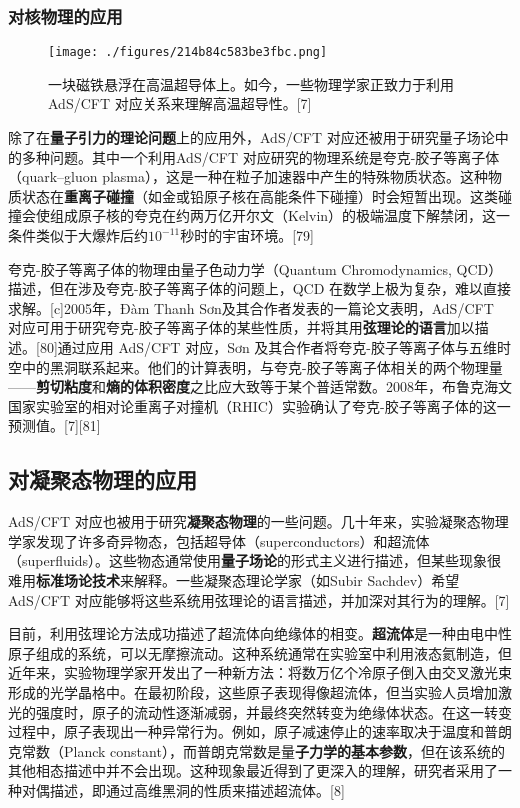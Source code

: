 \subsubsection{对核物理的应用}
\begin{figure}[ht]
\centering
\texttt{[image: ./figures/214b84c583be3fbc.png]}
\caption{一块磁铁悬浮在高温超导体上。如今，一些物理学家正致力于利用 AdS/CFT 对应关系来理解高温超导性。[7]} \label{fig_String_18}
\end{figure}
除了在\textbf{量子引力的理论问题}上的应用外，AdS/CFT 对应还被用于研究量子场论中的多种问题。其中一个利用AdS/CFT 对应研究的物理系统是夸克-胶子等离子体（quark–gluon plasma），这是一种在粒子加速器中产生的特殊物质状态。这种物质状态在\textbf{重离子碰撞}（如金或铅原子核在高能条件下碰撞）时会短暂出现。这类碰撞会使组成原子核的夸克在约两万亿开尔文（Kelvin）的极端温度下解禁闭，这一条件类似于大爆炸后约\(10^{-11}\)秒时的宇宙环境。[79]

夸克-胶子等离子体的物理由量子色动力学（Quantum Chromodynamics, QCD）描述，但在涉及夸克-胶子等离子体的问题上，QCD 在数学上极为复杂，难以直接求解。[c]2005年，Đàm Thanh Sơn及其合作者发表的一篇论文表明，AdS/CFT 对应可用于研究夸克-胶子等离子体的某些性质，并将其用\textbf{弦理论的语言}加以描述。[80]通过应用 AdS/CFT 对应，Sơn 及其合作者将夸克-胶子等离子体与五维时空中的黑洞联系起来。他们的计算表明，与夸克-胶子等离子体相关的两个物理量——\textbf{剪切粘度}和\textbf{熵的体积密度}之比应大致等于某个普适常数。2008年，布鲁克海文国家实验室的相对论重离子对撞机（RHIC）实验确认了夸克-胶子等离子体的这一预测值。[7][81]
\subsection{对凝聚态物理的应用} 
AdS/CFT 对应也被用于研究\textbf{凝聚态物理}的一些问题。几十年来，实验凝聚态物理学家发现了许多奇异物态，包括超导体（superconductors）和超流体（superfluids）。这些物态通常使用\textbf{量子场论}的形式主义进行描述，但某些现象很难用\textbf{标准场论技术}来解释。一些凝聚态理论学家（如Subir Sachdev）希望AdS/CFT 对应能够将这些系统用弦理论的语言描述，并加深对其行为的理解。[7]  

目前，利用弦理论方法成功描述了超流体向绝缘体的相变。\textbf{超流体}是一种由电中性原子组成的系统，可以无摩擦流动。这种系统通常在实验室中利用液态氦制造，但近年来，实验物理学家开发出了一种新方法：将数万亿个冷原子倒入由交叉激光束形成的光学晶格中。在最初阶段，这些原子表现得像超流体，但当实验人员增加激光的强度时，原子的流动性逐渐减弱，并最终突然转变为绝缘体状态。在这一转变过程中，原子表现出一种异常行为。例如，原子减速停止的速率取决于温度和普朗克常数（Planck constant），而普朗克常数是量\textbf{子力学的基本参数}，但在该系统的其他相态描述中并不会出现。这种现象最近得到了更深入的理解，研究者采用了一种对偶描述，即通过高维黑洞的性质来描述超流体。[8]
